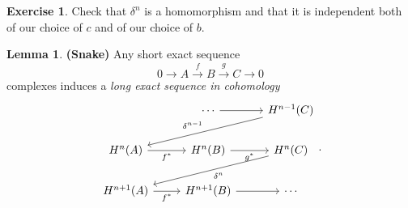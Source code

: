 \documentclass[10pt,letterpaper,cm]{nupset}
\theoremstyle{definition}
\newtheorem{lemma}{Lemma}
\newtheorem{exercise}{Exercise}
\newcommand{\1}{\mathbf{1}}
\newcommand{\0}{\vec 0}
\begin{document}
\begin{exercise}
Check that $\delta^n$ is a homomorphism and that it is independent both of our choice of $c$ and of our choice of $b$. 
\end{exercise}

\begin{lemma}{\textbf{(Snake)}}
Any short exact sequence $$0 \to A \overset{f}{\longrightarrow} B \overset{g}{\longrightarrow} C \to 0$$  complexes induces a \textit{long exact sequence in cohomology}
\[
\begin{tikzcd}
                                  & \cdots \arrow[r]              & H^{n-1}(C) \arrow[lld, "\delta^{n-1}"'] \\
H^n(A) \arrow[r, "f^{\ast}"']     & H^n(B) \arrow[r, "g^{\ast}"'] & H^n(C) \arrow[lld, "\delta^n"]          \\
H^{n+1}(A) \arrow[r, "f^{\ast}"'] & H^{n+1}(B) \arrow[r]          & \cdots                                 
\end{tikzcd}
.\]
\end{lemma}
\end{document}
